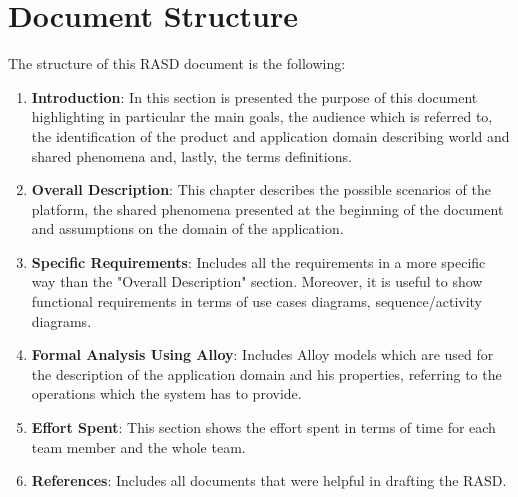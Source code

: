 \section{Document Structure}
The structure of this RASD document is the following:
\begin{enumerate}
    \item \textbf{Introduction}: In this section is presented the purpose of this document highlighting in particular the main goals, the audience which is referred to, the identification of the product and application domain  describing world and shared phenomena and, lastly, the terms definitions.
    \item \textbf{Overall Description}: This chapter describes the possible scenarios of the platform, the shared phenomena presented at the beginning of the document and assumptions on the domain of the application.
    \item \textbf{Specific Requirements}: Includes all the requirements in a more specific way than the "Overall Description" section. Moreover, it is useful to show functional requirements in terms of use cases diagrams, sequence/activity diagrams.
    \item \textbf{Formal Analysis Using Alloy}: Includes Alloy models which are used for the description of the application domain and his properties, referring to the operations which the system has to provide.
    \item \textbf{Effort Spent}: This section shows the effort spent in terms of time for each team member and the whole team.
    \item \textbf{References}: Includes all documents that were helpful in drafting the RASD.
\end{enumerate}